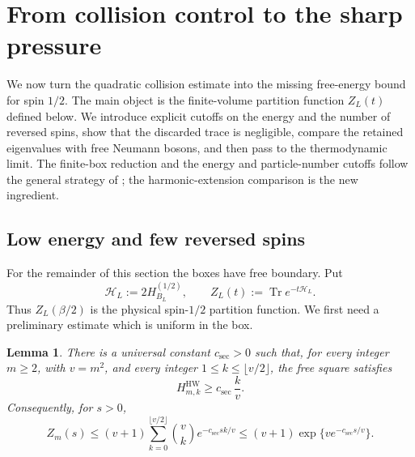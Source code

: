 \documentclass[11pt]{article}
\numberwithin{equation}{section}
\newtheorem{lemma}[theorem]{Lemma}
\theoremstyle{remark}
\newcommand{\Tr}{\operatorname{Tr}}
\newcommand{\1}{\mathbf 1}
\newcommand{\HW}{\mathrm{HW}}
\begin{document}
\section{From collision control to the sharp pressure}
\label{sec:pressure}

We now turn the quadratic collision estimate into the missing free-energy
bound for spin \(1/2\).  The main object is the finite-volume partition
function \(Z_L(t)\) defined below.  We introduce explicit cutoffs on the
energy and the number of reversed spins, show that the discarded trace is
negligible, compare the retained eigenvalues with free Neumann bosons, and
then pass to the thermodynamic limit.
The finite-box reduction and the energy and particle-number cutoffs follow
the general strategy of
\cite{CorreggiGiulianiSeiringer2015,NapiorkowskiSeiringer2021}; the
harmonic-extension comparison is the new ingredient.

\subsection{Low energy and few reversed spins}
\label{subsec:low-energy-cutoff}

For the remainder of this section the boxes have free boundary.  Put
\[
 \mathcal H_L:=2H_{B_L}^{(1/2)},\qquad
 Z_L(t):=\Tr e^{-t\mathcal H_L}.
\]
Thus \(Z_L(\beta/2)\) is the physical spin-\(1/2\) partition function.
We first need a preliminary estimate which is uniform in the box.

\begin{lemma}
\label{lem:rough-sector-energy}
There is a universal constant \(c_{\mathrm{sec}}>0\) such that, for every
integer \(m\geq2\), with \(v=m^2\), and every integer
\(1\leq k\leq\lfloor v/2\rfloor\), the free square satisfies
\begin{equation}
 H_{m,k}^{\HW}\geq c_{\mathrm{sec}}\,\frac{k}{v}.
 \label{eq:rough-sector-energy}
\end{equation}
Consequently, for \(s>0\),
\begin{equation}
 Z_m(s)\leq(v+1)\sum_{k=0}^{\lfloor v/2\rfloor}
 \binom vk e^{-c_{\mathrm{sec}}sk/v}
 \leq(v+1)\exp\{ve^{-c_{\mathrm{sec}}s/v}\}.
 \label{eq:rough-box-trace}
\end{equation}
\end{lemma}
\end{document}
